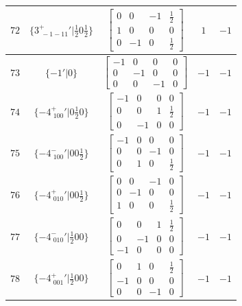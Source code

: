 \documentclass[fleqn,8pt]{jsarticle}
\begin{document}
\begin{longtable}{ccccc}
$ 72 $ & $ \{3^{+}_{\,\,-1-11}{}'|\frac{1}{2} 0 \frac{1}{2}\} $ & $ \begin{bmatrix} 0 & 0 & -1 & \frac{1}{2} \\ 1 & 0 & 0 & 0 \\ 0 & -1 & 0 & \frac{1}{2} \end{bmatrix} $ & $ 1 $ & $ -1 $ \\ \hline
$ 73 $ & $ \{-1{}'|0\} $ & $ \begin{bmatrix} -1 & 0 & 0 & 0 \\ 0 & -1 & 0 & 0 \\ 0 & 0 & -1 & 0 \end{bmatrix} $ & $ -1 $ & $ -1 $ \\ \hline
$ 74 $ & $ \{-4^{+}_{\,\,100}{}'|0 \frac{1}{2} 0\} $ & $ \begin{bmatrix} -1 & 0 & 0 & 0 \\ 0 & 0 & 1 & \frac{1}{2} \\ 0 & -1 & 0 & 0 \end{bmatrix} $ & $ -1 $ & $ -1 $ \\ \hline
$ 75 $ & $ \{-4^{-}_{\,\,100}{}'|0 0 \frac{1}{2}\} $ & $ \begin{bmatrix} -1 & 0 & 0 & 0 \\ 0 & 0 & -1 & 0 \\ 0 & 1 & 0 & \frac{1}{2} \end{bmatrix} $ & $ -1 $ & $ -1 $ \\ \hline
$ 76 $ & $ \{-4^{+}_{\,\,010}{}'|0 0 \frac{1}{2}\} $ & $ \begin{bmatrix} 0 & 0 & -1 & 0 \\ 0 & -1 & 0 & 0 \\ 1 & 0 & 0 & \frac{1}{2} \end{bmatrix} $ & $ -1 $ & $ -1 $ \\ \hline
$ 77 $ & $ \{-4^{-}_{\,\,010}{}'|\frac{1}{2} 0 0\} $ & $ \begin{bmatrix} 0 & 0 & 1 & \frac{1}{2} \\ 0 & -1 & 0 & 0 \\ -1 & 0 & 0 & 0 \end{bmatrix} $ & $ -1 $ & $ -1 $ \\ \hline
$ 78 $ & $ \{-4^{+}_{\,\,001}{}'|\frac{1}{2} 0 0\} $ & $ \begin{bmatrix} 0 & 1 & 0 & \frac{1}{2} \\ -1 & 0 & 0 & 0 \\ 0 & 0 & -1 & 0 \end{bmatrix} $ & $ -1 $ & $ -1 $ \\ \hline

\end{longtable}
\end{document}
